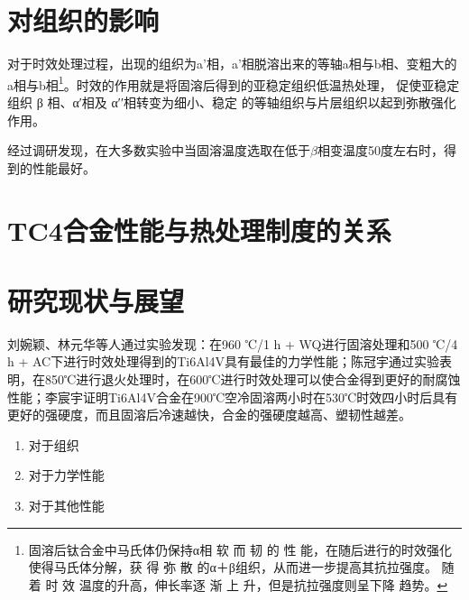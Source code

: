 \documentclass[
class = book,
zihao = -4,
font = noto,
paper = a4paper,
openany
]{easybook}
\newcommand{\ti}{Ti6Al4V}
\begin{document}
\section{对组织的影响}

对于时效处理过程，出现的组织为a'相，a'相脱溶出来的等轴a相与b相、变粗大的a相与b相\footnote{固溶后钛合金中马氏体仍保持α相 软 而 韧 的 性 能，在随后进行的时效强化使得马氏体分解，获 得 弥 散 的α＋β组织，从而进一步提高其抗拉强度。 随 着 时 效 温度的升高，伸长率逐 渐 上 升，但是抗拉强度则呈下降 趋势。}。\cite{zhanghaoyinGurongShixiaoduiTC4taihejinzuzhihelixuexingnengdeyingxiang2014}时效的作用就是将固溶后得到的亚稳定组织低温热处理， 促使亚稳定组织 β 相、α′相及 α′′相转变为细小、稳定 的等轴组织与片层组织以起到弥散强化作用。


经过调研发现，在大多数实验中当固溶温度选取在低于$ \beta $相变温度50度左右时，得到的性能最好。
\section{TC4合金性能与热处理制度的关系}

\section{研究现状与展望}
 刘婉颖、林元华等人通过实验发现：在960 ℃/1 h + WQ进行固溶处理和500 ℃/4 h + AC下进行时效处理得到的\ti 具有最佳的力学性能\cite{LiuWanYingBuTongReChuLiGongYiDuiTi6Al4VTaiHeJinWeiGuanJieGouHeLiXueXingNengYingXiangYingWen2017}；陈冠宇通过实验表明，在850℃进行退火处理时，在600℃进行时效处理可以使合金得到更好的耐腐蚀性能\cite{1200}；李宸宇证明\ti 合金在900℃空冷固溶两小时在530℃时效四小时后具有更好的强硬度，而且固溶后冷速越快，合金的强硬度越高、塑韧性越差\cite{900}。%


	\begin{enumerate}
		\item 对于组织
		\item 对于力学性能
		\item 对于其他性能
	\end{enumerate}


	\backmatter
	\listoffigures
	\listoftables
	\clearpage
	
\end{document}
